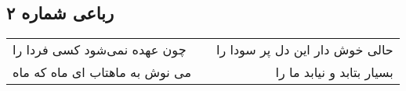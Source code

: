 \begin{center}
\section*{رباعی شماره ۲}
\label{sec:sh002}
\begin{longtable}{l p{0.5cm} r}
چون عهده نمی‌شود کسی فردا را
&&
حالی خوش دار این دل پر سودا را
\\
می نوش به ماهتاب ای ماه که ماه
&&
بسیار بتابد و نیابد ما را
\\
\end{longtable}
\end{center}
